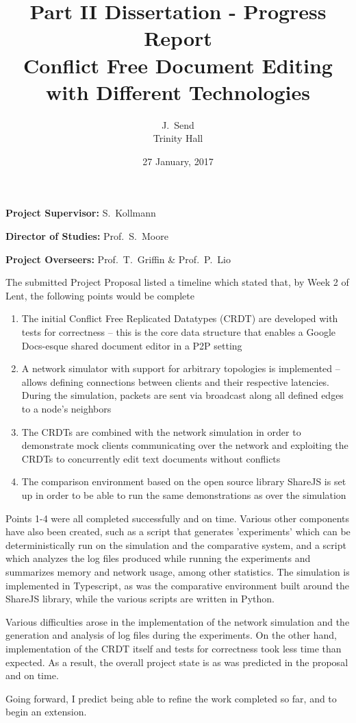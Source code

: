 \documentclass[12pt,a4paper,twoside]{article}
\begin{document}
\title{
\LARGE
Part II Dissertation - Progress Report \\
\Large 
Conflict Free Document Editing with Different Technologies \vspace{-1ex}}

\author{J.~Send \\ Trinity Hall\vspace{-1ex}}
\date{27 January, 2017}
\maketitle

\textbf{Project Supervisor:} S.~Kollmann

\textbf{Director of Studies:} Prof.~S.~Moore

\textbf{Project Overseers:} Prof.~T.~Griffin \&  Prof.~P.~Lio

\vspace{5mm}

The submitted Project Proposal listed a timeline which stated that, by Week 2 of Lent, the following points would be complete
\begin{enumerate}
\item The initial Conflict Free Replicated Datatypes (CRDT) are developed with tests for correctness -- this is the core data structure that enables a Google Docs-esque shared document editor in a P2P setting
\item A network simulator with support for arbitrary topologies is implemented -- allows defining connections between clients and their respective latencies. During the simulation, packets are sent via broadcast along all defined edges to a node's neighbors
\item The CRDTs are combined with the network simulation in order to demonstrate mock clients communicating over the network and exploiting the CRDTs to concurrently edit text documents without conflicts
\item The comparison environment based on the open source library ShareJS is set up in order to be able to run the same demonstrations as over the simulation
\end{enumerate}

Points 1-4 were all completed successfully and on time. Various other components have also been created, such as a script that generates 'experiments' which can be deterministically run on the simulation and the comparative system, and a script which analyzes the log files produced while running the experiments and summarizes memory and network usage, among other statistics. The simulation is implemented in Typescript, as was the comparative environment built around the ShareJS library, while the various scripts are written in Python.

Various difficulties arose in the implementation of the network simulation and the generation and analysis of log files during the experiments. On the other hand, implementation of the CRDT itself and tests for correctness took less time than expected. As a result, the overall project state is as was predicted in the proposal and on time.

Going forward, I predict being able to refine the work completed so far, and to begin an extension.
\end{document}
